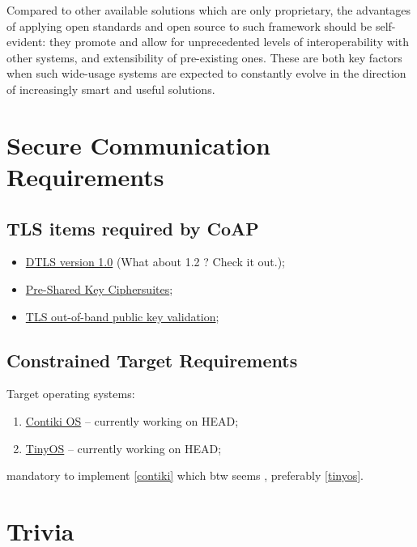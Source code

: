 \documentclass[10pt]{article}
\begin{document}
Compared to other available solutions which are only proprietary, the advantages of applying open standards and open source to such framework should be self-evident: they promote and allow for unprecedented levels of interoperability with other systems, and extensibility of pre-existing ones. These are both key factors when such wide-usage systems are expected to constantly evolve in the direction of increasingly smart and useful solutions.


\section{Secure Communication Requirements}

\subsection{TLS items required by CoAP}
\begin{itemize}
\item \href{http://tools.ietf.org/html/rfc4347}{DTLS version 1.0} (What about 1.2 ?  Check it out.);
\item \href{http://tools.ietf.org/html/rfc4279}{Pre-Shared Key Ciphersuites};
\item \href{http://tools.ietf.org/html/draft-wouters-tls-oob-pubkey}{TLS out-of-band public key validation};
\end{itemize}

\subsection{Constrained Target Requirements}
Target operating systems:
\begin{enumerate}
\item\label{contiki} \href{http://www.contiki-os.org}{Contiki OS} -- currently working on HEAD;
\item\label{tinyos} \href{http://www.tinyos.net}{TinyOS} -- currently working on HEAD;
\end{enumerate}

mandatory to implement \ref{contiki} which btw seems , preferably \ref{tinyos}.  

\section{Trivia}
\end{document}
